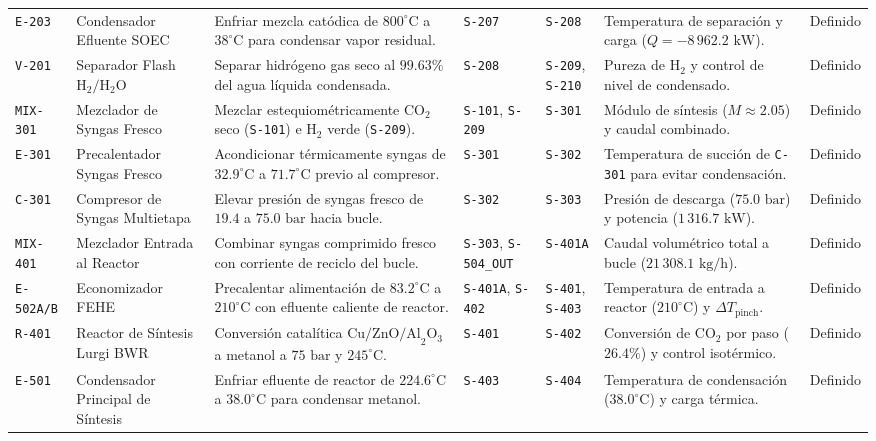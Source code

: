 \documentclass[10pt,letterpaper]{article}
\begin{document}
\begin{landscape}
\begin{xltabular}{\linewidth}{l >{\raggedright\arraybackslash}p{3.2cm} >{\raggedright\arraybackslash}X >{\centering\arraybackslash}p{2.0cm} >{\centering\arraybackslash}p{2.2cm} >{\raggedright\arraybackslash}p{4.5cm} c}
\texttt{E-203} & Condensador Efluente SOEC & Enfriar mezcla catódica de $800^\circ\text{C}$ a $38^\circ\text{C}$ para condensar vapor residual. & \texttt{S-207} & \texttt{S-208} & Temperatura de separación y carga ($Q=-8\,962.2\text{ kW}$). & Definido \\
\texttt{V-201} & Separador Flash $\text{H}_2/\text{H}_2\text{O}$ & Separar hidrógeno gas seco al $99.63\%$ del agua líquida condensada. & \texttt{S-208} & \texttt{S-209}, \texttt{S-210} & Pureza de $\text{H}_2$ y control de nivel de condensado. & Definido \\
\texttt{MIX-301} & Mezclador de Syngas Fresco & Mezclar estequiométricamente $\text{CO}_2$ seco (\texttt{S-101}) e $\text{H}_2$ verde (\texttt{S-209}). & \texttt{S-101}, \texttt{S-209} & \texttt{S-301} & Módulo de síntesis ($M \approx 2.05$) y caudal combinado. & Definido \\
\texttt{E-301} & Precalentador Syngas Fresco & Acondicionar térmicamente syngas de $32.9^\circ\text{C}$ a $71.7^\circ\text{C}$ previo al compresor. & \texttt{S-301} & \texttt{S-302} & Temperatura de succión de \texttt{C-301} para evitar condensación. & Definido \\
\texttt{C-301} & Compresor de Syngas Multietapa & Elevar presión de syngas fresco de $19.4$ a $75.0\text{ bar}$ hacia bucle. & \texttt{S-302} & \texttt{S-303} & Presión de descarga ($75.0\text{ bar}$) y potencia ($1\,316.7\text{ kW}$). & Definido \\
\texttt{MIX-401} & Mezclador Entrada al Reactor & Combinar syngas comprimido fresco con corriente de reciclo del bucle. & \texttt{S-303}, \texttt{S-504\_OUT} & \texttt{S-401A} & Caudal volumétrico total a bucle ($21\,308.1\text{ kg/h}$). & Definido \\
\texttt{E-502A/B} & Economizador FEHE & Precalentar alimentación de $83.2^\circ\text{C}$ a $210^\circ\text{C}$ con efluente caliente de reactor. & \texttt{S-401A}, \texttt{S-402} & \texttt{S-401}, \texttt{S-403} & Temperatura de entrada a reactor ($210^\circ\text{C}$) y $\Delta T_{\text{pinch}}$. & Definido \\
\texttt{R-401} & Reactor de Síntesis Lurgi BWR & Conversión catalítica $\text{Cu/ZnO/Al}_2\text{O}_3$ a metanol a $75\text{ bar}$ y $245^\circ\text{C}$. & \texttt{S-401} & \texttt{S-402} & Conversión de $\text{CO}_2$ por paso ($26.4\%$) y control isotérmico. & Definido \\
\texttt{E-501} & Condensador Principal de Síntesis & Enfriar efluente de reactor de $224.6^\circ\text{C}$ a $38.0^\circ\text{C}$ para condensar metanol. & \texttt{S-403} & \texttt{S-404} & Temperatura de condensación ($38.0^\circ\text{C}$) y carga térmica. & Definido \\

\end{xltabular}
\end{landscape}
\end{document}
